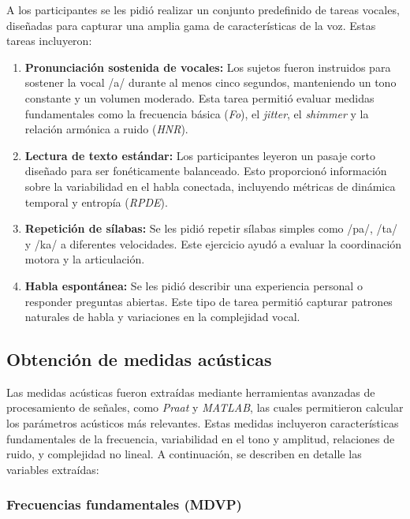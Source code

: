 \documentclass[listof=nochaptergap,12pt,times,authoryear]{report}
\begin{document}
A los participantes se les pidió realizar un conjunto predefinido de tareas vocales, diseñadas para capturar una amplia gama de características de la voz. Estas tareas incluyeron:

\begin{enumerate}
    \item \textbf{Pronunciación sostenida de vocales:} Los sujetos fueron instruidos para sostener la vocal /a/ durante al menos cinco segundos, manteniendo un tono constante y un volumen moderado. Esta tarea permitió evaluar medidas fundamentales como la frecuencia básica (\textit{Fo}), el \textit{jitter}, el \textit{shimmer} y la relación armónica a ruido (\textit{HNR}).
    \item \textbf{Lectura de texto estándar:} Los participantes leyeron un pasaje corto diseñado para ser fonéticamente balanceado. Esto proporcionó información sobre la variabilidad en el habla conectada, incluyendo métricas de dinámica temporal y entropía (\textit{RPDE}).
    \item \textbf{Repetición de sílabas:} Se les pidió repetir sílabas simples como /pa/, /ta/ y /ka/ a diferentes velocidades. Este ejercicio ayudó a evaluar la coordinación motora y la articulación.
    \item \textbf{Habla espontánea:} Se les pidió describir una experiencia personal o responder preguntas abiertas. Este tipo de tarea permitió capturar patrones naturales de habla y variaciones en la complejidad vocal.
\end{enumerate}



\subsection{Obtención de medidas acústicas}

Las medidas acústicas fueron extraídas mediante herramientas avanzadas de procesamiento de señales, como \textit{Praat} y \textit{MATLAB}, las cuales permitieron calcular los parámetros acústicos más relevantes. Estas medidas incluyeron características fundamentales de la frecuencia, variabilidad en el tono y amplitud, relaciones de ruido, y complejidad no lineal. A continuación, se describen en detalle las variables extraídas:

\subsubsection{Frecuencias fundamentales (MDVP)}
\end{document}
